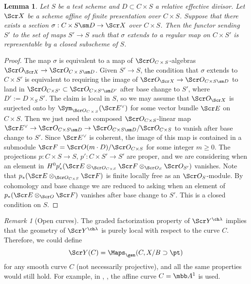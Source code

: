 \documentclass[final]{amsart}
\newtheorem{lem}[subsubsection]{Lemma}
\theoremstyle{remark}
\newtheorem{rem}[subsubsection]{Remark}
\theoremstyle{definition}
\DeclareMathOperator*{\xt}{\times}
\numberwithin{equation}{section}
\begin{document}
\begin{lem} \label{lem:extendsection} 
Let $S$ be a test scheme and $D \subset C\xt S$ a relative effective divisor.
Let $\Scr X$ be a scheme affine of finite presentation over $C\xt S$.
Suppose that there exists a section 
$\sigma : C\xt S \sm D \to \Scr X$ over $C\xt S$. 
Then the functor sending $S'$ to the set of 
maps $S'\to S$ such that $\sigma$ extends to a regular map on $C\xt S'$
is representable by a closed subscheme of $S$. 
\end{lem}
\begin{proof} The map $\sigma$ is equivalent to a map of 
$\Scr O_{C\xt S}$-algebras
$\Scr O_{\Scr X} \to \Scr O_{C\xt S\sm D}$. 
Given $S' \to S$, the condition that 
$\sigma$ extends to $C\xt S'$ is equivalent to 
requiring the image of 
$\Scr O_{\Scr X} \to \Scr O_{C\times S\sm D}$ to land in $\Scr O_{C\times S'} \subset \Scr O_{C\times S' \sm D'}$
after base change to $S'$, where $D':= D\xt_S S'$. 
The claim is local in $S$, so we may assume that
$\Scr O_{\Scr X}$ is surjected onto by 
$\Sym_{\Scr O_{C\xt S}}(\Scr E^\vee)$ for some
vector bundle $\Scr E$ on $C\xt S$. 
Then we just need the composed $\Scr O_{C\times S}$-linear map $\Scr E^\vee \to \Scr O_{C\times S \sm D} \to \Scr O_{C\times S\sm D}/\Scr O_{C\times S}$ to vanish after base change to $S'$.
Since $\Scr E^\vee$ is coherent, the image of this map 
is contained in a submodule $\Scr F = \Scr O(m\cdot D)/\Scr O_{C\times S}$
for some integer $m \ge 0$.  
The projections $p: C\times S \to S,\, p':C\times S'\to S'$ are proper, and we are considering
when an element in $H^0 p'_*( \Scr E \otimes_{\Scr O_{C\times S}} \Scr F \otimes_{\Scr O_S} \Scr O_{S'})$ vanishes. 
Note that $p_*(\Scr E \otimes_{\Scr O_{C\times S}} \Scr F)$ is finite locally free
as an $\Scr O_S$-module.
By cohomology and base change 
we are reduced to asking when an element of $p_*(\Scr E \otimes_{\Scr O} \Scr F)$
vanishes after base change to $S'$. 
This is a closed condition on $S$.
\end{proof}

\begin{rem}[Open curves] \label{rem:opencurve}
The graded factorization property of $\Scr Y^{\ch\lambda}$ implies that 
the geometry of $\Scr Y^{\ch\lambda}$ is purely local
with respect to the curve $C$. Therefore, we could define 
\[ \Scr Y(C) = \Maps_\gen(C, X/B \supset \pt) \]
for any smooth curve $C$ (not necessarily projective), and all 
the same properties would still hold.
For example, in \cite{FM}, \cite{Drinfeld}, the affine curve $C = \mbb A^1$ is used.
\end{rem}
\end{document}
